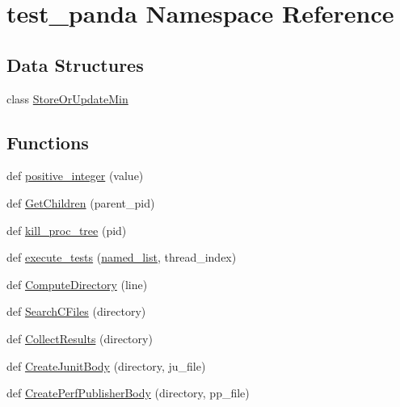 \hypertarget{namespacetest__panda}{}\section{test\+\_\+panda Namespace Reference}
\label{namespacetest__panda}
\subsection*{Data Structures}
\begin{DoxyCompactItemize}
\item 
class \hyperlink{classtest__panda_1_1StoreOrUpdateMin}{Store\+Or\+Update\+Min}
\end{DoxyCompactItemize}
\subsection*{Functions}
\begin{DoxyCompactItemize}
\item 
def \hyperlink{namespacetest__panda_a377e0cbd24df5a116b96365f6e224241}{positive\+\_\+integer} (value)
\item 
def \hyperlink{namespacetest__panda_a146f3fdf19c2b31d27990e1c44872718}{Get\+Children} (parent\+\_\+pid)
\item 
def \hyperlink{namespacetest__panda_adecb03888c930482a0044c4db02e9449}{kill\+\_\+proc\+\_\+tree} (pid)
\item 
def \hyperlink{namespacetest__panda_a141cf457e8422fb7cf53f38d87b8a3b2}{execute\+\_\+tests} (\hyperlink{namespacetest__panda_a2989f96cdaa7a4aef74fb9e12de11b07}{named\+\_\+list}, thread\+\_\+index)
\item 
def \hyperlink{namespacetest__panda_aecad727491366ab009da0c1bc773571e}{Compute\+Directory} (line)
\item 
def \hyperlink{namespacetest__panda_a8292fd9f0436c65b76dc0689a5be68c0}{Search\+C\+Files} (directory)
\item 
def \hyperlink{namespacetest__panda_a1c27d2a971da90549c473b4553865357}{Collect\+Results} (directory)
\item 
def \hyperlink{namespacetest__panda_a6844f5381f9afc285b33efc892f3befb}{Create\+Junit\+Body} (directory, ju\+\_\+file)
\item 
def \hyperlink{namespacetest__panda_a767af579398d78218e98aea5acbacf88}{Create\+Perf\+Publisher\+Body} (directory, pp\+\_\+file)
\end{DoxyCompactItemize}
